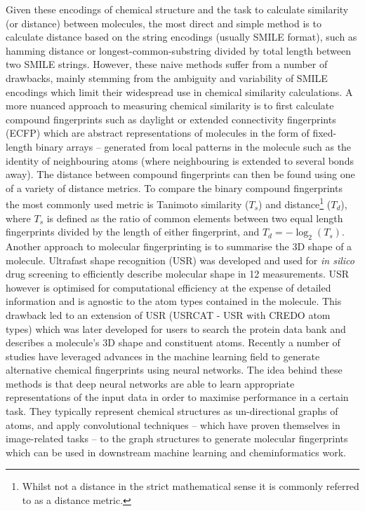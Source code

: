 \documentclass[a4paper,11pt,twoside,openright]{scrbook}
\begin{document}
Given these encodings of chemical structure and the task to calculate similarity (or distance) between molecules, the 
most direct and simple method is to calculate distance based on the string encodings (usually SMILE format), such as 
hamming distance or longest-common-substring divided by total length between two SMILE strings.\cite{Ozturk2016}
However, these naive methods  suffer from a number of drawbacks, mainly stemming from the ambiguity and variability of 
SMILE encodings which limit their widespread use in chemical similarity calculations.
A more nuanced approach to measuring chemical similarity is to first calculate  compound fingerprints such as daylight 
or extended connectivity fingerprints (ECFP) \cite{Rogers2010} which are abstract representations of molecules in the 
form of fixed-length binary arrays -- generated from local patterns in the molecule such as the identity of 
neighbouring atoms (where neighbouring is extended to several bonds away).
The distance between compound fingerprints can then be found using one of a variety of distance metrics.
To compare the binary compound fingerprints the most commonly used metric is Tanimoto similarity ($T_s$) and 
distance\footnote{Whilst not a distance in the  strict mathematical sense it is commonly referred to as a distance 
metric.} ($T_d$), where $T_s$ is defined as the ratio of common elements between two equal length fingerprints divided 
by the length of either fingerprint, and $T_d = -\log_2(T_s)$.
Another approach to molecular fingerprinting is to summarise the 3D shape of a molecule.
Ultrafast shape recognition (USR) was developed and used for \textit{in silico} drug screening to efficiently describe 
molecular shape in 12 measurements.
USR however is optimised for computational efficiency at the expense of detailed information and is agnostic to the 
atom types contained in the molecule.
This drawback led to an extension of USR (USRCAT - USR with CREDO atom types) which was later developed for users to 
search the protein data bank and describes a molecule's 3D shape and constituent atoms. \cite{Schreyer2012}
Recently a number of studies have leveraged advances in the machine learning field to generate alternative chemical 
fingerprints using neural networks. \cite{Kearnes2016a,Feinberg2018,Ma2018,Liu2018}
The idea behind these methods is that deep neural networks are able to learn appropriate representations of the input 
data in order to maximise performance in a certain task.
They typically represent chemical structures as un-directional graphs of atoms, and apply convolutional techniques -- 
which have proven themselves in image-related tasks -- to the graph structures to generate molecular fingerprints which 
can be used in downstream machine learning and cheminformatics work.
\end{document}
